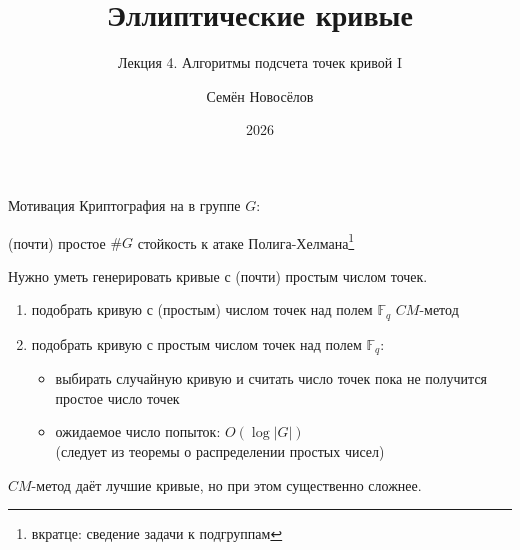 \documentclass{beamer}
\title{Эллиптические кривые}
\subtitle{Лекция 4. Алгоритмы подсчета точек кривой I}
\author{Семён Новосёлов}
\institute{БФУ им. И. Канта}
\date{2026}
\begin{document}
\frame{\titlepage}

\begin{frame}{Мотивация}
    Криптография на  в группе $G$:
    \begin{center}
    (почти) простое $\#G$ \structure{$\implies$} стойкость к атаке Полига-Хелмана\footnote{вкратце: сведение задачи к подгруппам}
 
    \vspace{1em}
    \structure{$\Downarrow$}
    \end{center}
    
    Нужно уметь генерировать кривые с (почти) простым числом точек.
\end{frame}

\begin{frame}
	\begin{enumerate}
		\item подобрать кривую с  (простым) числом точек над полем $\mathbb{F}_q$ \structure{$\implies$} $CM$-метод
		\vspace{0.5em}
		\item подобрать кривую с простым числом точек над полем $\mathbb{F}_q$:
		\begin{itemize}
			\item выбирать случайную кривую и считать число точек пока не получится простое число точек
			\item ожидаемое число попыток: $O(\log{|G|})$\\(следует из теоремы о распределении простых чисел)
		\end{itemize}
	\end{enumerate}
	\vspace{0.5em}
	$CM$-метод даёт лучшие кривые, но при этом существенно сложнее.
\end{frame}
\end{document}
